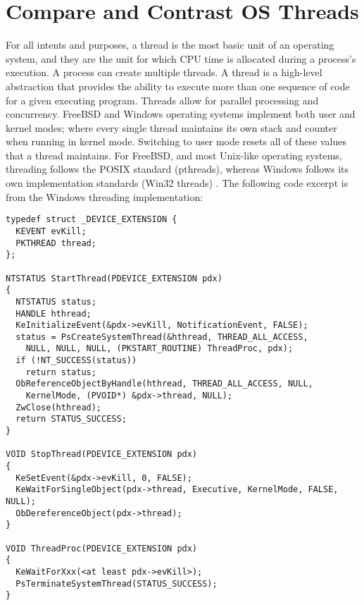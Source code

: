 \documentclass[letterpaper,10pt,draftclsnofoot,onecolumn]{IEEEtran}
\begin{document}
\section{Compare and Contrast OS Threads}
For all intents and purposes, a thread is the most basic unit of an operating system, and they are the unit for which CPU time is allocated during a process’s execution. A process can create multiple threads. A thread is a high-level abstraction that provides the ability to execute more than one sequence of code for a given executing program. Threads allow for parallel processing and concurrency. FreeBSD and Windows operating systems implement both user and kernel modes; where every single thread maintains its own stack and counter when running in kernel mode. Switching to user mode resets all of these values that a thread maintains. For FreeBSD, and most Unix-like operating systems, threading follows the POSIX standard (pthreads), whereas Windows follows its own implementation standards (Win32 threads) \cite{MSWindows1} \cite{FreeBSD2}. The following code excerpt is from the Windows threading implementation: \cite{PsCreateSystemThread} \cite{MSWindows3} \\


\begin{verbatim}
typedef struct _DEVICE_EXTENSION {
  KEVENT evKill;
  PKTHREAD thread;
};

NTSTATUS StartThread(PDEVICE_EXTENSION pdx)
{
  NTSTATUS status;
  HANDLE hthread;
  KeInitializeEvent(&pdx->evKill, NotificationEvent, FALSE);
  status = PsCreateSystemThread(&hthread, THREAD_ALL_ACCESS,
    NULL, NULL, NULL, (PKSTART_ROUTINE) ThreadProc, pdx);
  if (!NT_SUCCESS(status))
    return status;
  ObReferenceObjectByHandle(hthread, THREAD_ALL_ACCESS, NULL,
    KernelMode, (PVOID*) &pdx->thread, NULL);
  ZwClose(hthread);
  return STATUS_SUCCESS;
}

VOID StopThread(PDEVICE_EXTENSION pdx)
{
  KeSetEvent(&pdx->evKill, 0, FALSE);
  KeWaitForSingleObject(pdx->thread, Executive, KernelMode, FALSE, NULL);
  ObDereferenceObject(pdx->thread);
}

VOID ThreadProc(PDEVICE_EXTENSION pdx)
{
  KeWaitForXxx(<at least pdx->evKill>);
  PsTerminateSystemThread(STATUS_SUCCESS);
}
\end{verbatim}
\end{document}
